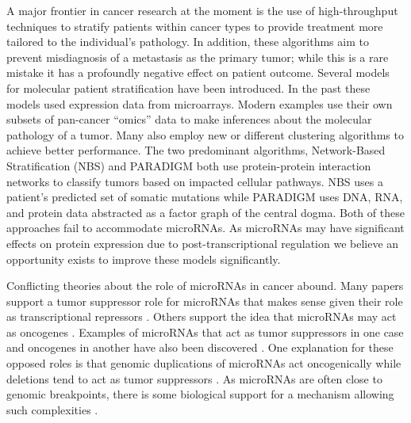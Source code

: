\documentclass[12pt]{report}
\begin{document}
A major frontier in cancer research at the moment is the use of high-throughput
techniques to stratify patients within cancer types to provide treatment more 
tailored to the individual's pathology. In addition, these algorithms aim
to prevent misdiagnosis of a metastasis as the primary tumor; while this is a rare mistake
it has a profoundly negative effect on patient outcome. Several models for molecular patient stratification
have been introduced. In the past these models used expression data from
microarrays. Modern examples use their own subsets of pan-cancer ``omics'' data
to make inferences about 
the molecular pathology of a tumor. Many also employ new or different clustering 
algorithms to achieve better performance. The two predominant algorithms, 
Network-Based Stratification (NBS) \cite{Hofree2013} and PARADIGM \cite{Vaske2010}
both use protein-protein interaction networks to classify tumors based on 
impacted cellular pathways. NBS uses a patient's predicted set of somatic
mutations while PARADIGM uses DNA, RNA, 
and protein data abstracted as a factor graph of the central dogma. Both of 
these approaches fail to accommodate microRNAs. As microRNAs may have 
significant effects on protein expression due to post-transcriptional regulation 
we believe an opportunity exists to improve these models significantly.


Conflicting theories about the role of microRNAs in cancer abound. Many papers 
support a tumor suppressor role for microRNAs that makes sense given their role 
as transcriptional repressors \cite{Bushati2007}. Others support the idea that microRNAs may act 
as oncogenes \cite{Gartel2008, Hammond2006}. Examples of microRNAs that act as tumor suppressors in one case 
and oncogenes in another have also been discovered \cite{Saraiya2013, Zhang2007}.
One explanation for these opposed roles is that genomic 
duplications of microRNAs act oncogenically while deletions tend to act as tumor 
suppressors \cite{Zhang2007}. As microRNAs are often close to genomic breakpoints, there is 
some biological support for a mechanism allowing such complexities \cite{Huppi2008}.
\end{document}

